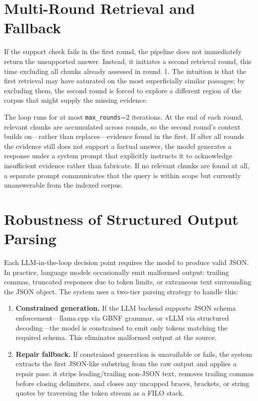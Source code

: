 \section{Multi-Round Retrieval and Fallback}

If the support check fails in the first round, the pipeline does not immediately return the unsupported answer. Instead, it initiates a second retrieval round, this time excluding all chunks already assessed in round~1. The intuition is that the first retrieval may have saturated on the most superficially similar passages; by excluding them, the second round is forced to explore a different region of the corpus that might supply the missing evidence.

The loop runs for at most \texttt{max\_rounds}=2 iterations. At the end of each round, relevant chunks are accumulated across rounds, so the second round's context builds on---rather than replaces---evidence found in the first. If after all rounds the evidence still does not support a factual answer, the model generates a response under a system prompt that explicitly instructs it to acknowledge insufficient evidence rather than fabricate. If no relevant chunks are found at all, a separate prompt communicates that the query is within scope but currently unanswerable from the indexed corpus.

\section{Robustness of Structured Output Parsing}

Each LLM-in-the-loop decision point requires the model to produce valid JSON. In practice, language models occasionally emit malformed output: trailing commas, truncated responses due to token limits, or extraneous text surrounding the JSON object. The system uses a two-tier parsing strategy to handle this:

\begin{enumerate}
    \item \textbf{Constrained generation.} If the LLM backend supports JSON schema enforcement---llama.cpp via GBNF grammar, or vLLM via structured decoding---the model is constrained to emit only tokens matching the required schema. This eliminates malformed output at the source.
    \item \textbf{Repair fallback.} If constrained generation is unavailable or fails, the system extracts the first JSON-like substring from the raw output and applies a repair pass: it strips leading/trailing non-JSON text, removes trailing commas before closing delimiters, and closes any uncapped braces, brackets, or string quotes by traversing the token stream as a FILO stack.
\end{enumerate}

